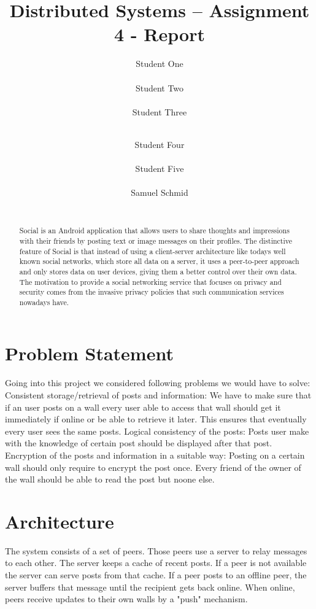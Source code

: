 \documentclass{report}
\title{Distributed Systems -- Assignment 4 - Report}
\author{
%
%
\alignauthor Student One\\
	\affaddr{ETH ID XX-XXX-XXX}\\
	\email{one@student.ethz.ch}
\alignauthor Student Two\\
	\affaddr{ETH ID XX-XXX-XXX}\\
	\email{two@student.ethz.ch}
\alignauthor Student Three\\
	\affaddr{ETH ID XX-XXX-XXX}\\
	\email{three@student.ethz.ch}
\and  %
\alignauthor Student Four\\
 	\affaddr{ETH ID XX-XXX-XXX}\\
 	\email{four@student.ethz.ch}
\alignauthor Student Five\\
 	\affaddr{ETH ID XX-XXX-XXX}\\
 	\email{five@student.ethz.ch}
\alignauthor Samuel Schmid\\
 	\affaddr{ETH ID 10-919-991}\\
 	\email{schmisam@student.ethz.ch}
}
\begin{document}
\maketitle

\begin{abstract}
Social is an Android application that allows users to share thoughts and impressions with their friends by posting text or image messages on their profiles.
The distinctive feature of Social is that instead of using a client-server architecture like todays well known social networks, which store all data on a server, it uses a peer-to-peer approach and only stores data on user devices, giving them a better control over their own data.
The motivation to provide a social networking service that focuses on privacy and security comes from the invasive privacy policies that such communication services nowadays have.
\end{abstract}

\section{Problem Statement}

Going into this project we considered following problems we would have to solve: \newline
Consistent storage/retrieval of posts and information:  \newline
We have to make sure that if an user posts on a wall every user able to access that wall should get it immediately if online or be able to retrieve it later. This ensures that eventually every user sees the same posts.  \newline
Logical consistency of the posts:  \newline
Posts user make with the knowledge of certain post should be displayed after that post.  \newline
Encryption of the posts and information in a suitable way:  \newline
Posting on a certain wall should only require to encrypt the post once. Every friend of the owner of the wall should be able to read the post but noone else. \newline

\section{Architecture}

The system consists of a set of peers. Those peers use a server to relay messages to each other. The server keeps a cache of recent posts. If a peer is not available the server can serve posts from that cache. If a peer posts to an offline peer, the server buffers that message until the recipient gets back online. When online, peers receive updates to their own walls by a "push" mechanism.
\end{document}
